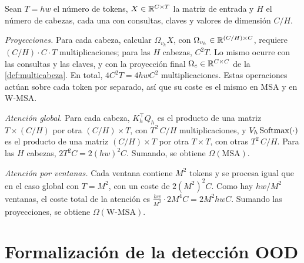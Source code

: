 \begin{demostracion}
Sean $T = hw$ el número de tokens, $X\in\mathbb{R}^{C\times T}$ la matriz de entrada y $H$
el número de cabezas, cada una con consultas, claves y valores de dimensión
$C/H$.

\emph{Proyecciones.} Para cada cabeza, calcular $\Omega_{v_h}X$, con
$\Omega_{v_h}\in\mathbb{R}^{(C/H)\times C}$, requiere $(C/H)\cdot C\cdot T$
multiplicaciones; para las $H$ cabezas, $C^2T$. Lo mismo ocurre con las consultas
y las claves, y con la proyección final $\Omega_c\in\mathbb{R}^{C\times C}$ de la
\cref{def:multicabeza}. En total, $4C^2T = 4hwC^2$ multiplicaciones. Estas
operaciones actúan sobre cada token por separado, así que su coste es el mismo en
MSA y en W-MSA.

\emph{Atención global.} Para cada cabeza, $K_h^{\top}Q_h$ es el producto de una
matriz $T\times(C/H)$ por otra $(C/H)\times T$, con $T^2\,C/H$ multiplicaciones,
y $V_h\operatorname{Softmax}(\cdot)$ es el producto de una matriz $(C/H)\times T$ por otra
$T\times T$, con otras $T^2\,C/H$. Para las $H$ cabezas, $2T^2C = 2(hw)^2C$.
Sumando, se obtiene $\Omega(\mathrm{MSA})$.

\emph{Atención por ventanas.} Cada ventana contiene $M^2$ tokens y se procesa
igual que en el caso global con $T = M^2$, con un coste de $2(M^2)^2C$. Como hay
$hw/M^2$ ventanas, el coste total de la atención es
$\frac{hw}{M^2}\cdot 2M^4C = 2M^2hwC$. Sumando las proyecciones, se obtiene
$\Omega(\text{W-MSA})$.
\end{demostracion}

\section{Formalización de la detección OOD}\label{sec:dem-ood}

